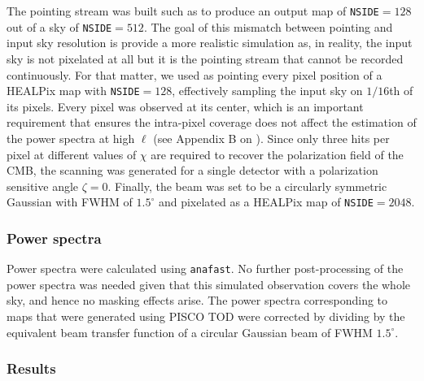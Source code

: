 \documentclass[a4paper,11pt]{article}
\begin{document}
The pointing stream was built such as to produce an output map of \texttt{NSIDE}$=128$ out of a sky of \texttt{NSIDE}$=512$. The goal of this mismatch between pointing and input sky resolution is provide a more realistic simulation as, in reality, the input sky is not pixelated at all but it is the pointing stream that cannot be recorded continuously. For that matter, we used as pointing every pixel position of a HEALPix map with \texttt{NSIDE}$=128$, effectively sampling the input sky on $1/16$th of its pixels. Every pixel was observed at its center, which is an important requirement that ensures the intra-pixel coverage does not affect the estimation of the power spectra at high $\ell$ (see Appendix B on \cite{2005poutanen}). Since only three hits per pixel at different values of $\chi$ are required to recover the polarization field of the CMB, the scanning was generated for a single detector with a polarization sensitive angle $\zeta=0$. Finally, the beam was set to be a circularly symmetric Gaussian with FWHM of $1.5^\circ$ and pixelated as a HEALPix map of \texttt{NSIDE}$=2048$.

\subsubsection{Power spectra}

Power spectra were calculated using \texttt{anafast}. No further post-processing of the power spectra was needed given that this simulated observation covers the whole sky, and hence no masking effects arise. The power spectra corresponding to maps that were generated using PISCO TOD were corrected by dividing by the equivalent beam transfer function of a circular Gaussian beam of FWHM $1.5^\circ$. 

\subsubsection{Results}
\end{document}
